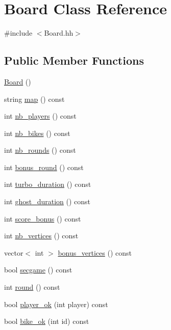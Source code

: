 \hypertarget{classBoard}{}\section{Board Class Reference}
\label{classBoard}


{\ttfamily \#include $<$Board.\+hh$>$}

\subsection*{Public Member Functions}
\begin{DoxyCompactItemize}
\item 
\hyperlink{classBoard_a9ee491d4fea680cf69b033374a9fdfcb}{Board} ()
\item 
string \hyperlink{classBoard_a7a06cb5193dd816d7850741f7f97022b}{map} () const 
\item 
int \hyperlink{classBoard_a13264a6a522abfbde89448f47285c83e}{nb\+\_\+players} () const 
\item 
int \hyperlink{classBoard_a88d91cb787a7d62de1ea9888a420c4c5}{nb\+\_\+bikes} () const 
\item 
int \hyperlink{classBoard_a252fc5395d645442ab072bced15ea955}{nb\+\_\+rounds} () const 
\item 
int \hyperlink{classBoard_ae280a089d2983460a98b0a7ccb5b91fe}{bonus\+\_\+round} () const 
\item 
int \hyperlink{classBoard_a2d6322f0a4857566c51c5108b2c463d0}{turbo\+\_\+duration} () const 
\item 
int \hyperlink{classBoard_a473b3e31e91029d4c838b2c5e299dc61}{ghost\+\_\+duration} () const 
\item 
int \hyperlink{classBoard_aaeb853587bb34f76189b0c1d086eb647}{score\+\_\+bonus} () const 
\item 
int \hyperlink{classBoard_aeb851363b87f3aa2b721cd178b762a9a}{nb\+\_\+vertices} () const 
\item 
vector$<$ int $>$ \hyperlink{classBoard_aa096dab63bb4b4211188a471bba8483e}{bonus\+\_\+vertices} () const 
\item 
bool \hyperlink{classBoard_a8e0edf29d2459d95abcd1dd868347f76}{secgame} () const 
\item 
int \hyperlink{classBoard_a3c6fb370cb74669a678022efe0729e68}{round} () const 
\item 
bool \hyperlink{classBoard_a287b6a18f8986d37d0e50a86e102a0bd}{player\+\_\+ok} (int player) const 
\item 
bool \hyperlink{classBoard_aed2506b801f4189ecb6200271ab26acd}{bike\+\_\+ok} (int id) const 

\end{DoxyCompactItemize}

